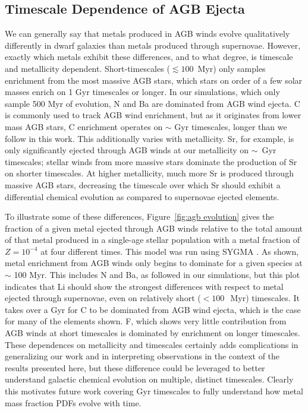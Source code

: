 \documentclass[twocolumn]{aastex61}
\begin{document}
\subsection{Timescale Dependence of AGB Ejecta}
\label{sec:discussion:metal yields}
We can generally say that metals produced in AGB winds evolve qualitatively differently in dwarf galaxies than metals produced through supernovae. However, exactly which metals exhibit these differences, and to what degree, is timescale and metallicity dependent. Short-timescales ($\lesssim 100$~Myr) only samples enrichment from the most massive AGB stars, which stars on order of a few solar masses enrich on 1 Gyr timescales or longer. In our simulations, which only sample 500 Myr of evolution, N and Ba are dominated from AGB wind ejecta. C is commonly used to track AGB wind enrichment, but as it originates from lower mass AGB stars, C enrichment operates on $\sim$ Gyr timescales, longer than we follow in this work. This additionally varies with metallicity. Sr, for example, is only significantly ejected through AGB winds at our metallicity on $\sim$~Gyr timescales; stellar winds from more massive stars dominate the production of Sr on shorter timescales. At higher metallicity, much more Sr is produced through massive AGB stars, decreasing the timescale over which Sr should exhibit a differential chemical evolution as compared to supernovae ejected elements.

To illustrate some of these differences, Figure~\ref{fig:agb evolution} gives the fraction of a given metal ejected through AGB winds relative to the total amount of that metal produced in a single-age stellar population with a metal fraction of $Z = 10^{-4}$ at four different times. This model was run using \textsc{SYGMA} \citep{Ritter2017}. As shown, metal enrichment from AGB winds only begins to dominate for a given species at $\sim$ 100 Myr. This includes N and Ba, as followed in our simulations, but this plot indicates that Li should show the strongest differences with respect to metal ejected through supernovae, even on relatively short ($< 100~$~Myr) timescales. It takes over a Gyr for C to be dominated from AGB wind ejecta, which is the case for many of the elements shown. F, which shows very little contribution from AGB winds at short timescales is dominated by enrichment on longer timescales. These dependences on metallicity and timescales certainly adds complications in generalizing our work and in interpreting observations in the context of the results presented here, but these difference could be leveraged to better understand galactic chemical evolution on multiple, distinct timescales. Clearly this motivates future work covering Gyr timescales to fully understand how metal mass fraction PDFs evolve with time.
\end{document}
